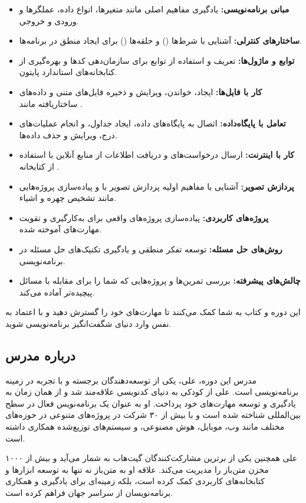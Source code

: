 \documentclass[a4paper,12pt]{article}
\begin{document}
	\begin{itemize}
		\item \textbf{مبانی برنامه‌نویسی:} یادگیری مفاهیم اصلی مانند متغیرها، انواع داده، عملگرها و ورودی و خروجی.
		\item \textbf{ساختارهای کنترلی:} آشنایی با شرط‌ها () و حلقه‌ها () برای ایجاد منطق در برنامه‌ها.
		\item \textbf{توابع و ماژول‌ها:} تعریف و استفاده از توابع برای سازمان‌دهی کدها و بهره‌گیری از کتابخانه‌های استاندارد پایتون.
		\item \textbf{کار با فایل‌ها:} ایجاد، خواندن، ویرایش و ذخیره فایل‌های متنی و داده‌های ساختاریافته مانند .
		\item \textbf{تعامل با پایگاه‌داده:} اتصال به پایگاه‌های داده، ایجاد جداول، و انجام عملیات‌های درج، ویرایش و حذف داده‌ها.
		\item \textbf{کار با اینترنت:} ارسال درخواست‌های  و دریافت اطلاعات از منابع آنلاین با استفاده از کتابخانه .
		\item \textbf{پردازش تصویر:} آشنایی با مفاهیم اولیه پردازش تصویر با  و پیاده‌سازی پروژه‌هایی مانند تشخیص چهره و اشیاء.
		\item \textbf{پروژه‌های کاربردی:} پیاده‌سازی پروژه‌های واقعی برای به‌کارگیری و تقویت مهارت‌های آموخته شده.
		\item \textbf{روش‌های حل مسئله:} توسعه تفکر منطقی و یادگیری تکنیک‌های حل مسئله در برنامه‌نویسی.
		\item \textbf{چالش‌های پیشرفته:} بررسی تمرین‌ها و پروژه‌هایی که شما را برای مقابله با مسائل پیچیده‌تر آماده می‌کند.
	\end{itemize}
	
	این دوره و کتاب به شما کمک می‌کنند تا مهارت‌های خود را گسترش دهید و با اعتماد به نفس وارد دنیای شگفت‌انگیز برنامه‌نویسی شوید.
	
	
	\subsection*{درباره مدرس}
	
	مدرس این دوره، علی، یکی از توسعه‌دهندگان برجسته و با تجربه در زمینه برنامه‌نویسی است. علی از کودکی به دنیای کدنویسی علاقه‌مند شد و از همان زمان به یادگیری و توسعه مهارت‌های خود پرداخت. او به عنوان یک برنامه‌نویس فعال در سطح بین‌المللی شناخته شده است و با بیش از ۳۰ شرکت در پروژه‌های متنوعی در حوزه‌های مختلف مانند وب، موبایل، هوش مصنوعی، و سیستم‌های توزیع‌شده همکاری داشته است.
	
	علی همچنین یکی از برترین مشارکت‌کنندگان گیت‌هاب به شمار می‌آید و بیش از ۱۰۰۰ مخزن متن‌باز را مدیریت می‌کند. علاقه او به متن‌باز نه تنها به توسعه ابزارها و کتابخانه‌های کاربردی کمک کرده است، بلکه زمینه‌ای برای یادگیری و همکاری برنامه‌نویسان از سراسر جهان فراهم کرده است.
	
\end{document}
